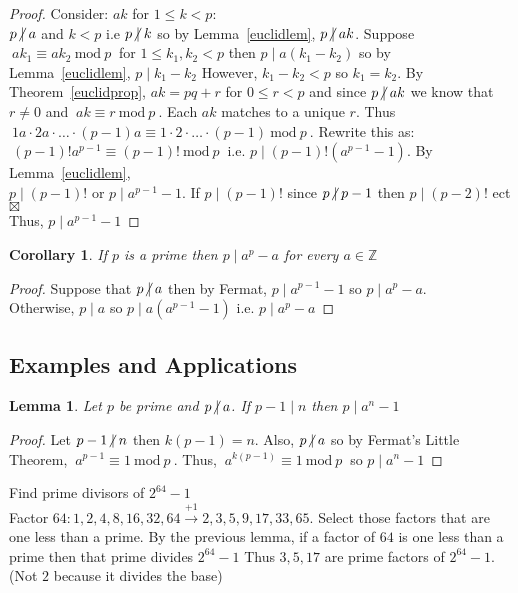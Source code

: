 \documentclass[12pt]{extarticle}
\renewcommand\qedsymbol{$\square$}
\newcommand{\cont}{$\boxtimes$}
\newcommand{\divides}{\mid}
\newcommand{\ndivides}{\centernot \mid}
\newcommand{\Z}{\mathbb{Z}}
\newtheorem{lemma}[theorem]{Lemma}
\newtheorem{corollary}[theorem]{Corollary}
\newenvironment{definition}[1][Definition:]{\begin{trivlist}
\item[\hskip \labelsep {\bfseries #1}]}{\end{trivlist}}
\newenvironment{lproof}{\begin{proof} \renewcommand{\qedsymbol}{}}{\end{proof}}
\renewcommand{\mod}[3]{\: #1 \equiv #2 \: \mathrm{mod} \: #3 \:}
\begin{document}
\begin{proof}
Consider: $ak$ for $1 \le k < p$: \\ $p \ndivides a$ and $k < p$ i.e $p \ndivides k$ so by Lemma~\ref{euclidlem}, $p \ndivides ak$. Suppose $\mod{ak_1}{ak_2}{p}$ for $1 \le k_1,k_2 < p$ then $p \divides a(k_1-k_2)$ so by Lemma~\ref{euclidlem}, $p \divides k_1-k_2$ However, $k_1 - k_2 < p$ so $k_1 = k_2$. By Theorem~\ref{euclidprop}, $ak = pq + r$ for $0 \le r < p$ and since $p \ndivides ak$ we know that $r \neq 0$ and $\mod{ak}{r}{p}$. Each $ak$ matches to a unique $r$. Thus $\mod{1a \cdot  2a \cdot \ldots  \cdot (p-1)a}{1  \cdot 2 \cdot  \ldots  \cdot (p-1)}{p}$. Rewrite this as: \\ $\mod{(p-1)!   a^{p-1}}{(p-1)!}{p}$ i.e. $p \divides (p-1)!   (a^{p-1}-1)$. 
By Lemma~\ref{euclidlem}, \\ $p \divides (p-1)!$ or $p \divides a^{p-1} - 1$.  If $p \divides (p-1)!$ since $p \ndivides p-1$ then $p \divides (p-2)!$ ect \cont \\ Thus, $p \divides a^{p-1} - 1$   
\end{proof}

\begin{corollary}
\label{fermatlittlealternate}
If $p$ is a prime then $p \divides a^p - a$ for every $a \in \Z$
\end{corollary}

\begin{lproof}
Suppose that $p \ndivides a$ then by Fermat, $p \divides a^{p-1} - 1$ so $p \divides a^p - a$.\\
Otherwise, $p \divides a$ so $p \divides a(a^{p-1} - 1)$ i.e. $p \divides a^p - a$
\end{lproof}

\subsection{Examples and Applications}

\begin{lemma}
Let $p$ be prime and $p \ndivides a$. If $p - 1 \divides n$ then $p \divides a^n - 1$
\end{lemma}

\begin{lproof}
Let $p - 1 \ndivides n$ then $k(p-1) = n$. Also, $p \ndivides a$ so by Fermat's Little Theorem, $\mod{a^{p-1}}{1}{p}$. Thus, $\mod{a^{k(p-1)}}{1}{p}$ so $p \divides a^n - 1$
\end{lproof}

\begin{definition}[Example:]
Find prime divisors of $2^{64} - 1$ \\ Factor $64: 1,2,4,8,16,32,64 \xrightarrow{+1} 2, 3, 5, 9, 17, 33, 65$. Select those factors that are one less than a prime. By the previous lemma, if a factor of $64$ is one less than a prime then that prime divides $2^{64} - 1$ Thus $3,5,17$ are prime factors of $2^{64} - 1$. \\ (Not $2$ because it divides the base)
\end{definition}
\end{document}
